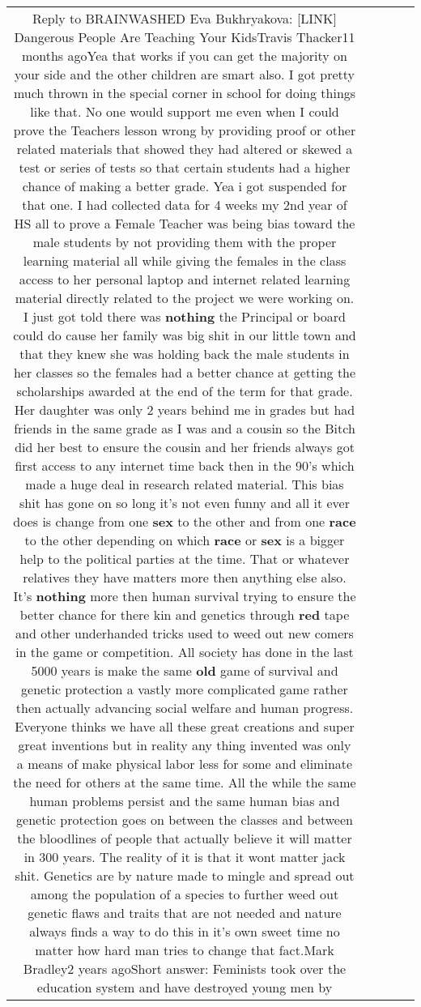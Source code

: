 \documentclass[11pt]{article}
\newlength\mylength
\begin{document}
\begin{center}
\begin{longtable}{|C{.65\mylength}|C{.30\mylength}|C{.12\mylength}|C{.12\mylength}|C{.12\mylength}|}
  \small Reply to BRAINWASHED Eva Bukhryakova:  [LINK]  Dangerous People Are Teaching Your KidsTravis Thacker11 months agoYea that works if you can get the majority on your side and the other children are smart also.  I got pretty much thrown in the special corner in school for doing things like that. No one would support me even when I could prove the Teachers lesson wrong by providing proof or other related materials that showed they had altered or skewed a test or series of tests so that certain students had a higher  chance of making a better grade.  Yea i got suspended for that one.   I had collected data for 4 weeks my 2nd year of HS all to prove a Female Teacher was being bias toward the male students by not providing them with the proper learning material all while giving the females in the class access to her personal laptop and internet related learning material directly related to the project we were working on.   I just got told there was \textbf{nothing} the Principal or board could do cause her family was big shit in our little town and that they knew she was holding back the male students in her classes so the females had a better chance at getting the scholarships awarded at the end of the term for that grade.  Her daughter was only 2 years behind me in grades but had friends in the same grade as I was and a cousin so the Bitch did her best to ensure the cousin and her friends always got first access to any internet time back then in the 90's which made a huge deal in research related material.    This bias shit has gone on so long it's not even funny and all it ever does is change from one \textbf{sex} to the other and from one \textbf{race} to the other depending on which \textbf{race} or \textbf{sex} is a bigger help to the political parties at the time.  That or whatever relatives they have matters more then anything else also. It's \textbf{nothing} more then human survival trying to ensure the better chance for there kin and genetics through \textbf{r\textbf{ed}} tape and other underhanded tricks used to weed out new comers in the game or competition.  All society has done in the last 5000 years is make the same \textbf{old} game of survival and genetic protection a vastly more complicated game rather then actually advancing social welfare and human progress.    Everyone thinks we have all these great creations and super great inventions but in reality any thing invented was only a means of make physical labor less for some and eliminate the need for others at the same time. All the while the same human problems persist and the same human bias and genetic protection goes on between the classes and between the bloodlines of people that actually believe it will matter in 300 years.  The reality of it is that it wont matter jack shit.  Genetics are by nature made to mingle and spread out among the population of a species to further weed out genetic flaws and traits that are not needed and nature always finds a way to do this in it's own sweet time no matter how hard man tries to change that fact.Mark Bradley2 years agoShort answer: Feminists took over the education system and have destroyed young men by 
\end{longtable}
\end{center}
\end{document}
